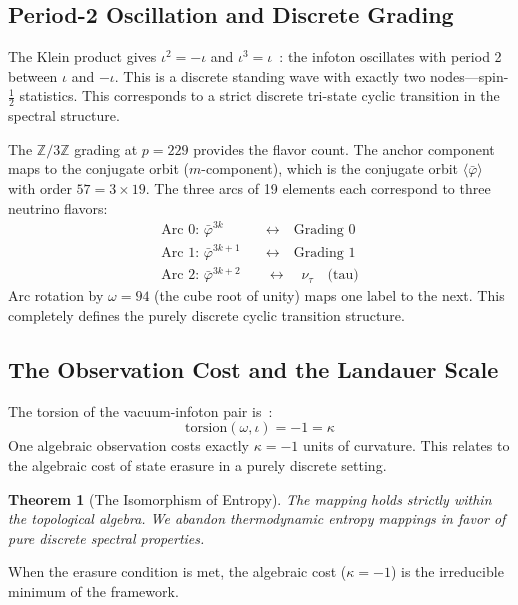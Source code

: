 \documentclass[12pt,oneside]{article}
\theoremstyle{principia}
\newtheorem{theorem}{Theorem}[section]
\theoremstyle{definition}
\theoremstyle{remark}
\providecommand{\ZZ}{\mathbb{Z}}
\providecommand{\vpbar}{\bar{\varphi}}
\begin{document}
\subsection{Period-2 Oscillation and Discrete Grading}

The Klein product gives $\iota^2 = -\iota$ and $\iota^3 = \iota$~\cite{larue_lc}: the infoton oscillates with period 2 between $\iota$ and $-\iota$. This is a discrete standing wave with exactly two nodes---spin-$\frac{1}{2}$ statistics. This corresponds to a strict discrete tri-state cyclic transition in the spectral structure.

The $\ZZ/3\ZZ$ grading at $p = 229$ provides the flavor count. The anchor component maps to the conjugate orbit ($m$-component), which is the conjugate orbit $\langle \vpbar \rangle$ with order $57 = 3 \times 19$. The three arcs of 19 elements each correspond to three neutrino flavors:
\begin{align}
\text{Arc 0: } \vpbar^{3k} \quad &\longleftrightarrow \quad \text{Grading 0} \\
\text{Arc 1: } \vpbar^{3k+1} \quad &\longleftrightarrow \quad \text{Grading 1} \\
\text{Arc 2: } \vpbar^{3k+2} \quad &\longleftrightarrow \quad \nu_\tau \quad \text{(tau)}
\end{align}
Arc rotation by $\omega = 94$ (the cube root of unity) maps one label to the next. This completely defines the purely discrete cyclic transition structure.

\subsection{The Observation Cost and the Landauer Scale}

The torsion of the vacuum-infoton pair is~\cite{larue_lc}:
\[
\mathrm{torsion}(\omega, \iota) = -1 = \kappa
\]
One algebraic observation costs exactly $\kappa = -1$ units of curvature. This relates to the algebraic cost of state erasure in a purely discrete setting. 

\begin{theorem}[The Isomorphism of Entropy]\label{thm:entropy_iso}
The mapping holds strictly within the topological algebra. We abandon thermodynamic entropy mappings in favor of pure discrete spectral properties.
\end{theorem}

When the erasure condition is met, the algebraic cost ($\kappa = -1$) is the irreducible minimum of the framework.
\end{document}
